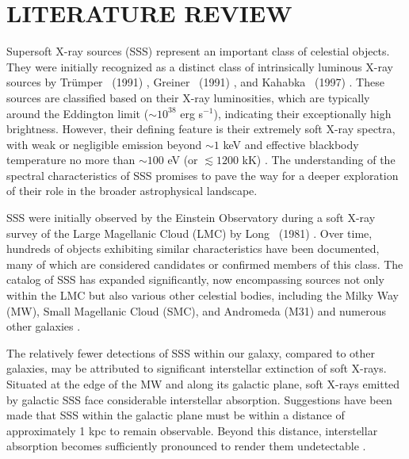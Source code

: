     \setcounter{footnote}{\value{footnotecount}}
    
    \newpage
    \section{\MakeUppercase{Literature Review}} \label{multi-obs:lit-rev}
    	Supersoft X-ray sources (SSS) represent an important class of celestial objects. They were initially recognized as a distinct class of intrinsically luminous X-ray sources by Trümper \etal\ (1991) \cite{trumper1991x}, Greiner \etal\ (1991) \cite{greiner1991rosat}, and Kahabka \etal\ (1997) \cite{kahabka97}. These sources are classified based on their X-ray luminosities, which are typically around the Eddington limit ($\sim 10^{38}$ erg s$^{-1}$), indicating their exceptionally high brightness. However, their defining feature is their extremely soft X-ray spectra, with weak or negligible emission beyond $\sim 1$ keV and effective blackbody temperature no more than $\sim 100$ eV (or $\lesssim 1200$ kK) \cite{kahabka06}. The understanding of the spectral characteristics of SSS promises to pave the way for a deeper exploration of their role in the broader astrophysical landscape.
    	
    	SSS were initially observed by the Einstein Observatory during a soft X-ray survey of the Large Magellanic Cloud (LMC) by Long \etal\ (1981) \cite{long81}. Over time, hundreds of objects exhibiting similar characteristics have been documented, many of which are considered candidates or confirmed members of this class. The catalog of SSS has expanded significantly, now encompassing sources not only within the LMC but also various other celestial bodies, including the Milky Way (MW), Small Magellanic Cloud (SMC), and Andromeda (M31) and numerous other galaxies \cite{kahabkatrumper1996,steinerdiaz1998,greiner2000,pietsch2003deep,di2003luminous,orio2010census,henze2010recent,sturm2012new,galiullin2021populations}.
    	
    	The relatively fewer detections of SSS within our galaxy, compared to other galaxies, may be attributed to significant interstellar extinction of soft X-rays. Situated at the edge of the MW and along its galactic plane, soft X-rays emitted by galactic SSS face considerable interstellar absorption. Suggestions have been made that SSS within the galactic plane must be within a distance of approximately 1 kpc to remain observable. Beyond this distance, interstellar absorption becomes sufficiently pronounced to render them undetectable \cite{van1992accreting}.
    	
